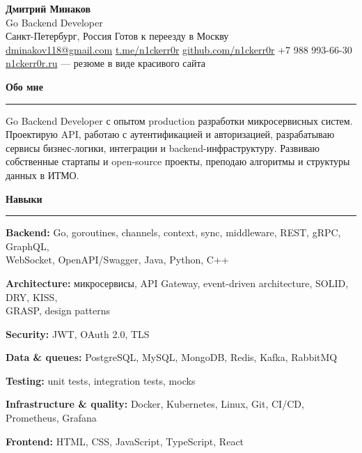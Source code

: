 \documentclass[10pt,a4paper]{article}
\newcommand{\resumesection}[1]{
  \vspace{3pt}
  {\large\bfseries\color{sectioncolor} #1}\par
  \vspace{1pt}
  \hrule
  \vspace{2pt}
}
\begin{document}
\begin{center}
	{\LARGE \textbf{Дмитрий Минаков}}\\[6pt]
	Go Backend Developer\\[4pt]
	Санкт-Петербург, Россия \textbar{} Готов к переезду в Москву\\[4pt]
	\href{mailto:dminakov118@gmail.com}{dminakov118@gmail.com}
	\textbar{} \href{https://t.me/n1ckerr0r}{t.me/n1ckerr0r}
	\textbar{} \href{https://github.com/n1ckerr0r}{github.com/n1ckerr0r}
	\textbar{} +7 988 993-66-30\\[4pt]
	{\small\href{https://n1ckerr0r.ru}{n1ckerr0r.ru} --- резюме в виде красивого сайта}
\end{center}

\resumesection{Обо мне}
Go Backend Developer с опытом production разработки микросервисных систем. Проектирую API, работаю с аутентификацией и авторизацией, разрабатываю сервисы бизнес-логики, интеграции и backend-инфраструктуру. Развиваю собственные стартапы и open-source проекты, преподаю алгоритмы и структуры данных в ИТМО.

\resumesection{Навыки}
{\small\textbf{Backend:} Go, goroutines, channels, context, sync, middleware, REST, gRPC, GraphQL,\\ WebSocket, OpenAPI/Swagger, Java, Python, C++}

\vspace{1pt}
{\small\textbf{Architecture:} микросервисы, API Gateway, event-driven architecture, SOLID, DRY, KISS,\\ GRASP, design patterns}

\vspace{1pt}
{\small\textbf{Security:} JWT, OAuth 2.0, TLS}

\vspace{1pt}
{\small\textbf{Data \& queues:} PostgreSQL, MySQL, MongoDB, Redis, Kafka, RabbitMQ}

\vspace{1pt}
{\small\textbf{Testing:} unit tests, integration tests, mocks}

\vspace{1pt}
{\small\textbf{Infrastructure \& quality:} Docker, Kubernetes, Linux, Git, CI/CD, Prometheus, Grafana}

\vspace{1pt}
{\small\textbf{Frontend:} HTML, CSS, JavaScript, TypeScript, React}
\end{document}
